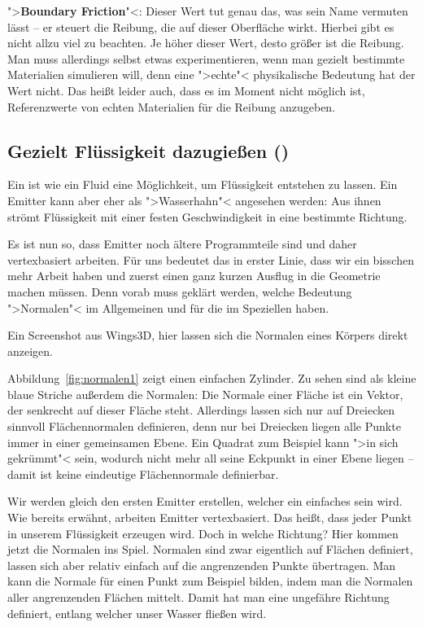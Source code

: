 \documentclass[10pt,DIV=14,a4paper]{scrartcl}
\begin{document}
	\item ">\textbf{Boundary Friction}"<: Dieser Wert tut genau das, was
	sein Name vermuten lässt -- er steuert die Reibung, die auf dieser
	Oberfläche wirkt. Hierbei gibt es nicht allzu viel zu beachten. Je
	höher dieser Wert, desto größer ist die Reibung. Man muss allerdings
	selbst etwas experimentieren, wenn man gezielt bestimmte Materialien
	simulieren will, denn eine ">echte"< physikalische Bedeutung hat der
	Wert nicht. Das heißt leider auch, dass es im Moment nicht möglich
	ist, Referenzwerte von echten Materialien für die Reibung anzugeben.

\itE


\subsection{Gezielt Flüssigkeit dazugießen ()}
Ein  ist wie ein Fluid eine Möglichkeit, um Flüssigkeit
entstehen zu lassen. Ein Emitter kann aber eher als ">Wasserhahn"<
angesehen werden: Aus ihnen strömt Flüssigkeit mit einer festen
Geschwindigkeit in eine bestimmte Richtung.

Es ist nun so, dass Emitter noch ältere Programmteile sind und daher
vertexbasiert arbeiten. Für uns bedeutet das in erster
Linie, dass wir ein bisschen mehr Arbeit haben und zuerst einen ganz
kurzen Ausflug in die Geometrie machen müssen. Denn vorab muss geklärt
werden, welche Bedeutung ">Normalen"< im Allgemeinen und für die
\fluidsim im Speziellen haben.

{Ein Screenshot aus Wings3D, hier lassen sich die Normalen eines Körpers
direkt anzeigen.}

Abbildung~\ref{fig:normalen1} zeigt einen einfachen Zylinder. Zu sehen
sind als kleine blaue Striche außerdem die Normalen: Die Normale einer
Fläche ist ein Vektor, der senkrecht auf dieser Fläche steht. Allerdings
lassen sich nur auf Dreiecken sinnvoll Flächennormalen definieren, denn
nur bei Dreiecken liegen alle Punkte immer in einer gemeinsamen Ebene.
Ein Quadrat zum Beispiel kann ">in sich gekrümmt"< sein, wodurch nicht
mehr all seine Eckpunkt in einer Ebene liegen -- damit ist keine
eindeutige Flächennormale definierbar.

Wir werden gleich den ersten Emitter erstellen, welcher ein einfaches
\TriMesh sein wird. Wie bereits erwähnt, arbeiten Emitter vertexbasiert.
Das heißt, dass jeder Punkt in unserem \TriMesh Flüssigkeit erzeugen
wird. Doch in welche Richtung? Hier kommen jetzt die Normalen ins Spiel.
Normalen sind zwar eigentlich auf Flächen definiert, lassen sich aber
relativ einfach auf die angrenzenden Punkte übertragen. Man kann die
Normale für einen Punkt zum Beispiel bilden, indem man die Normalen
aller angrenzenden Flächen mittelt. Damit hat man eine ungefähre
Richtung definiert, entlang welcher unser Wasser fließen wird.
\end{document}
